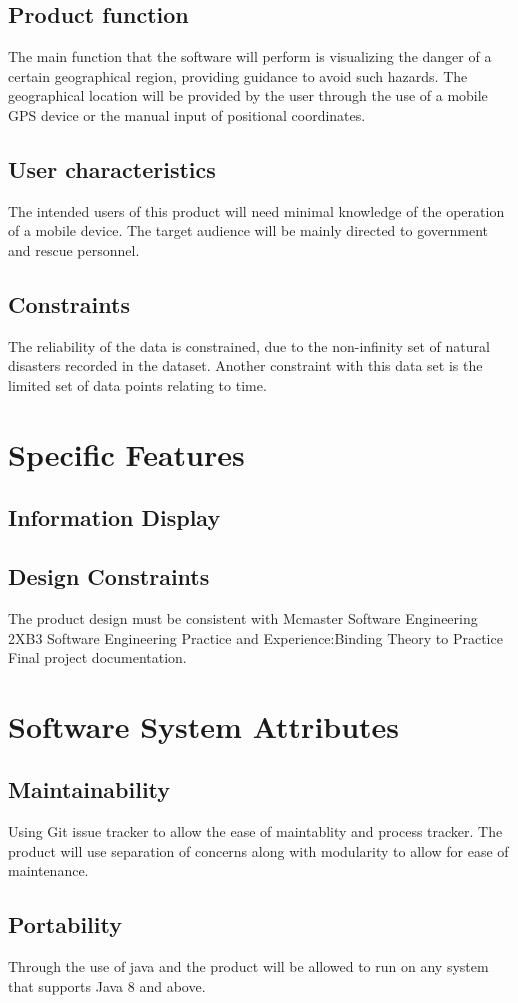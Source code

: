 \documentclass{article}
\begin{document}
\subsection{Product function}
The main function that the software will perform is visualizing the danger 
of a certain geographical region, providing guidance to avoid such 
hazards. The geographical location will be provided by the user 
through the use of a mobile GPS device or the manual input of positional 
coordinates.   

\subsection{User characteristics}
The intended users of this product will need minimal knowledge of the 
operation of a mobile device. The target audience will be mainly directed 
to government and rescue personnel.

\subsection{Constraints}
The reliability of the data is constrained, due to the non-infinity set 
of natural disasters recorded in the dataset. Another constraint with 
this data set is the limited set of data points relating to time.  

\section{Specific Features}
\subsection{Information Display}

\subsection{Design Constraints}
The product design must be consistent with Mcmaster Software Engineering 2XB3 Software Engineering Practice and Experience:Binding Theory to Practice Final project documentation.

\section{Software System Attributes}
\subsection{Maintainability}
Using Git issue tracker to allow the ease of maintablity and process tracker. The product will use separation of concerns along with modularity to allow for ease of maintenance.
\subsection{Portability}
Through the use of java and the product will be allowed to run on any system that supports Java 8 and above.
\end{document}

